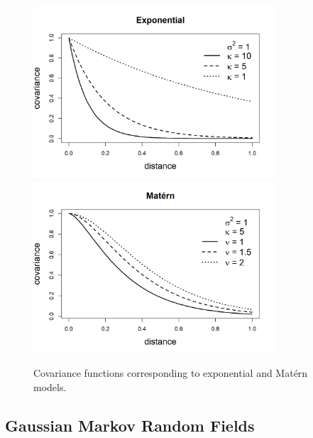 \begin{figure}[H]
    \centering
    \includegraphics[width=0.8\textwidth]{covariancefunctions-1.png}
    \includegraphics[width=0.8\textwidth]{covariancefunctions-2.png}
    \caption{Covariance functions corresponding to exponential and Matérn models.}
    \label{fig:covariance}
\end{figure}
\subsection{Gaussian Markov Random Fields}
